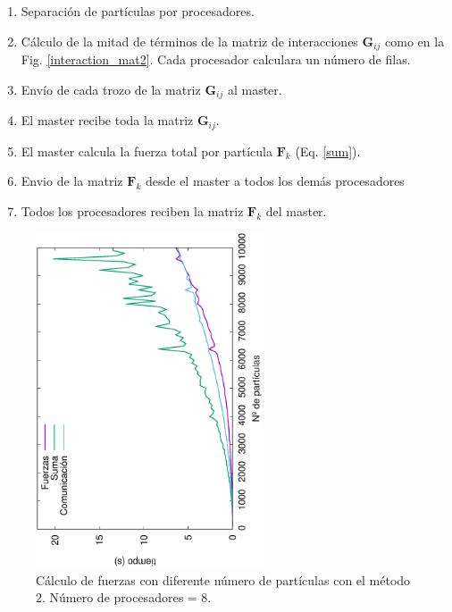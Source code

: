 \documentclass[onecolumn]{article}
\renewcommand{\vec}[1]{\mathbf{#1}}
\begin{document}
\begin{enumerate}
    \item Separación de partículas por procesadores.
    \item Cálculo de la mitad de términos de la matriz de interacciones $\vec{G}_{ij}$ como en la Fig. \ref{interaction_mat2}. Cada procesador calculara un número de filas.
    \item Envío de cada trozo de la matriz $\vec{G}_{ij}$ al master.
    \item El master recibe toda la matriz $\vec{G}_{ij}$.
    \item El master calcula la fuerza total por partícula $\vec{F}_{k}$ (Eq. \ref{sum}).
    \item Envio de la matriz $\vec{F}_{k}$ desde el master a todos los demás procesadores
    \item Todos los procesadores reciben la matriz $\vec{F}_{k}$ del master.
\end{enumerate}

\begin{figure}[ht]
\begin{center}
\includegraphics[width=0.6\textwidth, angle=-90]{forces_part1.eps}
\caption{Cálculo de fuerzas con diferente número de partículas con el método 2. Número de procesadores = 8.}
\label{xabi_3}
\end{center}
\end{figure}
\end{document}
